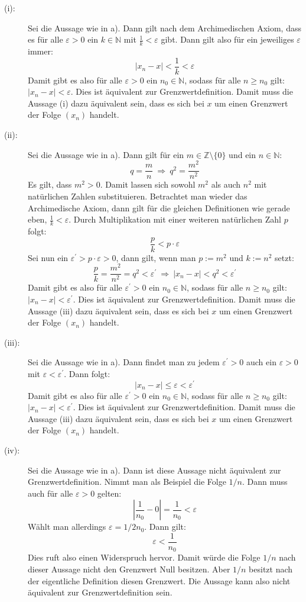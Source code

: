 \documentclass[10pt, a4paper]{article}
\begin{document}
			\begin{description}
				\item[(i):] Sei die Aussage wie in a). Dann gilt nach dem Archimedischen Axiom, dass es für alle $\varepsilon > 0$ ein $k\in \mathbb{N}$ mit $\frac{1}{k}<\varepsilon$ gibt. Dann gilt also für ein jeweiliges $\varepsilon$ immer:
				\[
					|x_n-x| < \frac{1}{k} < \varepsilon
				\]
				Damit gibt es also für alle $\varepsilon > 0$ ein $n_0 \in \mathbb{N}$, sodass für alle $n \geq n_0$ gilt: $|x_n-x| < \varepsilon$. Dies ist äquivalent zur Grenzwertdefinition. Damit muss die Aussage (i) dazu äquivalent sein, dass es sich bei $x$ um einen Grenzwert der Folge $(x_n)$ handelt.
				
				\item[(ii):] Sei die Aussage wie in a). Dann gilt für ein $m \in \mathbb{Z}\setminus \{0\}$ und ein $n \in \mathbb{N}$:
				\[
					q = \dfrac{m}{n} \ \Rightarrow \ q^2 = \dfrac{m^2}{n^2} 
				\]
				Es gilt, dass $m^2 > 0$. Damit lassen sich sowohl $m^2$ als auch $n^2$ mit natürlichen Zahlen substituieren.
				Betrachtet man wieder das Archimedische Axiom, dann gilt für die gleichen Definitionen wie gerade eben, $\frac{1}{k}<\varepsilon$. Durch Multiplikation mit einer weiteren natürlichen Zahl $p$ folgt:
				\[
					\dfrac{p}{k} < p\cdot\varepsilon
				\]
				Sei nun ein $\varepsilon^\prime > p\cdot\varepsilon > 0$, dann gilt, wenn man $p:=m^2$ und $k:=n^2$ setzt:
				\[
					\dfrac{p}{k} = \dfrac{m^2}{n^2} = q^2 < \varepsilon^\prime \ \Rightarrow \ |x_n-x| < q^2 < \varepsilon^\prime
				\]
				Damit gibt es also für alle $\varepsilon^\prime > 0$ ein $n_0 \in \mathbb{N}$, sodass für alle $n \geq n_0$ gilt: $|x_n-x| < \varepsilon^\prime$. Dies ist äquivalent zur Grenzwertdefinition. Damit muss die Aussage (iii) dazu äquivalent sein, dass es sich bei $x$ um einen Grenzwert der Folge $(x_n)$ handelt.

				\item[(iii):] Sei die Aussage wie in a). Dann findet man zu jedem $\varepsilon^\prime > 0$ auch ein $\varepsilon > 0$ mit $\varepsilon < \varepsilon^\prime$. Dann folgt:
				\[
					|x_n-x| \leq \varepsilon < \varepsilon^\prime
				\]
				Damit gibt es also für alle $\varepsilon^\prime > 0$ ein $n_0 \in \mathbb{N}$, sodass für alle $n \geq n_0$ gilt: $|x_n-x| < \varepsilon^\prime$. Dies ist äquivalent zur Grenzwertdefinition. Damit muss die Aussage (iii) dazu äquivalent sein, dass es sich bei $x$ um einen Grenzwert der Folge $(x_n)$ handelt.

				\item[(iv):] Sei die Aussage wie in a). Dann ist diese Aussage nicht äquivalent zur Grenzwertdefinition. Nimmt man als Beispiel die Folge $1/n$. Dann muss auch für alle $\varepsilon > 0$ gelten:
				\[
					\left| \dfrac{1}{n_0} - 0 \right| = \dfrac{1}{n_0} < \varepsilon
				\]
				Wählt man allerdings $\varepsilon = 1/2n_0$. Dann gilt:
				\[
					\varepsilon < \dfrac{1}{n_0}
				\]
				Dies ruft also einen Widerspruch hervor. Damit würde die Folge $1/n$ nach dieser Aussage nicht den Grenzwert Null besitzen. Aber $1/n$ besitzt nach der eigentliche Definition diesen Grenzwert. Die Aussage kann also nicht äquivalent zur Grenzwertdefinition sein.


\end{description}
\end{document}
